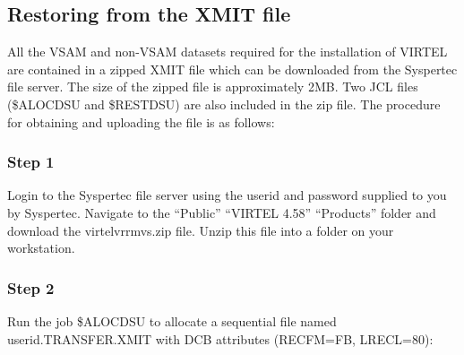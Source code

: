 \documentclass[letterpaper,10pt,english]{sphinxmanual}
\begin{document}
\ignorespaces 

\subsection{Restoring from the XMIT file}
\label{\detokenize{Installation_Guide:restoring-from-the-xmit-file}}\label{\detokenize{Installation_Guide:index-4}}
All the VSAM and non-VSAM datasets required for the installation of VIRTEL are contained in a zipped XMIT file which can be downloaded from the Syspertec file server. The size of the zipped file is approximately 2MB. Two JCL files (\$ALOCDSU and \$RESTDSU) are also     included in the zip file. The procedure for obtaining and uploading the file is as follows:


\subsubsection{Step 1}
\label{\detokenize{Installation_Guide:step-1}}
Login to the Syspertec file server  using the userid and password supplied to you by Syspertec. Navigate to the “Public” \textendash{} “VIRTEL 4.58” \textendash{} “Products” folder and download the virtelvrrmvs.zip file. Unzip this file into a folder on your workstation.

\newpage


\subsubsection{Step 2}
\label{\detokenize{Installation_Guide:step-2}}
Run the job \$ALOCDSU to allocate a sequential file named userid.TRANSFER.XMIT with DCB attributes (RECFM=FB, LRECL=80):
\end{document}
